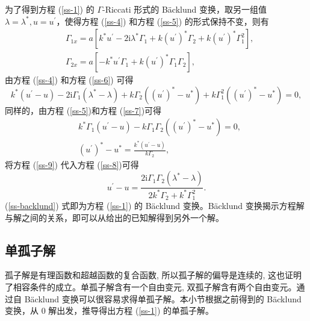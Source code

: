 为了得到方程 (\ref{ss-1}) 的 $\Gamma$-Riccati 形式的 B\"acklund 变换，取另一组值 $\lambda = \lambda^{*}, u = u^{'}$，使得方程 (\ref{ss-4}) 和方程 (\ref{ss-5}) 的形式保持不变，则有
\begin{align}
  & \Gamma_{1x} = a\left[k^{*}u^{'} - 2\mathrm{i}\lambda^{*}\Gamma_{1} + k(u^{'})^{*}\Gamma_{2} + k(u^{'})^{*}\Gamma_{1}^{2}\right], \label{ss-6} \\
  & \Gamma_{2x} = a\left[-k^{*}u^{'}\Gamma_{1} + k(u^{'})^{*}\Gamma_{1}\Gamma_{2}\right], \label{ss-7}
\end{align}
由方程 (\ref{ss-4}) 和方程 (\ref{ss-6}) 可得
\begin{equation}
  k^{*}(u^{'}-u) - 2\mathrm{i}\Gamma_{1}(\lambda^{*}-\lambda) + k\Gamma_{2}((u^{'})^{*}-u^{*}) + k\Gamma_{1}^{2}((u^{'})^{*}-u^{*}) = 0, \label{ss-8}
\end{equation}
同样的，由方程 (\ref{ss-5})和方程 (\ref{ss-7})可得
\begin{align}
  & k^{*}\Gamma_{1}(u^{'}-u) - k\Gamma_{1}\Gamma_{2}((u^{'})^{*}-u^{*}) = 0, \\
  & (u^{'})^{*} - u^{*} = \frac{k^{*}(u^{'}-u)}{k\Gamma_{2}}, \label{ss-9}
\end{align}
将方程 (\ref{ss-9}) 代入方程 (\ref{ss-8})可得
\begin{equation}
  u^{'} - u = \frac{2\mathrm{i}\Gamma_{1}\Gamma_{2}(\lambda^{*}-\lambda)}{2k^{*}\Gamma_{2} + k^{*}\Gamma_{1}^{2}}. \label{ss-backlund}
\end{equation}
(\ref{ss-backlund}) 式即为方程 (\ref{ss-1}) 的 B\"acklund 变换。B\"acklund 变换揭示方程解与解之间的关系，即可以从给出的已知解得到另外一个解。

\subsection{单孤子解}
孤子解是有理函数和超越函数的复合函数, 所以孤子解的偏导是连续的, 这也证明了相容条件的成立。单孤子解含有一个自由变元, 双孤子解含有两个自由变元。通过自 B\"{a}cklund 变换可以很容易求得单孤子解。本小节根据之前得到的 B\"acklund 变换，从 0 解出发，推导得出方程 (\ref{ss-1}) 的单孤子解。

